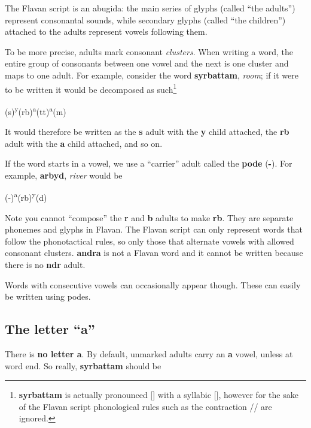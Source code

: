 \documentclass[10pt,oneside]{memoir}
\newcommand{\ipa}[1]{/\textipa{#1}/}
\newcommand{\apa}[1]{[\textipa{#1}]}
\begin{document}
The Flavan script is an abugida: the main series of glyphs (called ``the adults'') represent consonantal sounds, while secondary glyphs (called ``the children'') attached to the adults represent vowels following them.

To be more precise, adults mark consonant \emph{clusters}. When writing a word, the entire group of consonants between one vowel and the next is one cluster and maps to one adult. For example, consider the word \textbf{syrbattam}, \emph{room}; if it were to be written it would be decomposed as such\footnote{\textbf{syrbattam} is actually pronounced \apa{s\s{r}"bat:am} with a syllabic \apa{r}, however for the sake of the Flavan script phonological rules such as the contraction \ipa{1r} \textrightarrow \apa{\s{r}} are ignored.}

\begin{center}
    \Large (s)\textsuperscript{y}(rb)\textsuperscript{a}(tt)\textsuperscript{a}(m)
\end{center}

It would therefore be written as the \textbf{s} adult with the \textbf{y} child attached, the \textbf{rb} adult with the \textbf{a} child attached, and so on.

If the word starts in a vowel, we use a ``carrier'' adult called the \textbf{pode} (\textbf{-}). For example, \textbf{arbyd}, \emph{river} would be

\begin{center}
    \LARGE (-)\textsuperscript{a}(rb)\textsuperscript{y}(d)
\end{center}

Note you cannot ``compose'' the \textbf{r} and \textbf{b} adults to make \textbf{rb}. They are separate phonemes and glyphs in Flavan. The Flavan script can only represent words that follow the phonotactical rules, so only those that alternate vowels with allowed consonant clusters. \textbf{andra} is not a Flavan word and it cannot be written because there is no \textbf{ndr} adult.

Words with consecutive vowels can occasionally appear though. These can easily be written using podes.

\subsection{The letter ``a''}

There is \textbf{no letter a}. By default, unmarked adults carry an \textbf{a} vowel, unless at word end. So really, \textbf{syrbattam} should be
\end{document}
